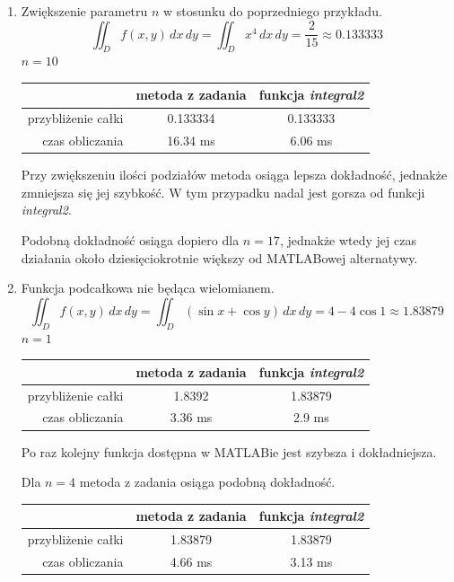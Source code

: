 \documentclass[12pt]{article}
\begin{document}
\begin{enumerate}[label=\textbf{Przykład \arabic*}]
		
		\item
		Zwiększenie parametru $n$ w stosunku do poprzedniego przykładu.
		$$\iint_D f(x, y) \,dx\,dy = \iint_D x^4 \,dx\,dy = \frac{2}{15} \approx 0.133333$$
		$n = 10$
		
		\begin{table}[H]
			\centering
			\begin{tabular}{|r|c|c|}
				\hline
				                   & metoda z zadania & funkcja \textit{integral2} \\ \hline
				przybliżenie całki &     0.133334     &          0.133333          \\ \hline
				   czas obliczania &     16.34 ms     &          6.06 ms           \\ \hline
			\end{tabular}
		\end{table}
	
		Przy zwiększeniu ilości podziałów metoda osiąga lepsza dokładność, jednakże zmniejsza się jej szybkość. W tym przypadku nadal jest gorsza od funkcji \textit{integral2}.
		
		Podobną dokładność osiąga dopiero dla $n = 17$, jednakże wtedy jej czas działania około dziesięciokrotnie większy od MATLABowej alternatywy.
		
		
		\item
		Funkcja podcałkowa nie będąca wielomianem.
		$$\iint_D f(x, y) \,dx\,dy = \iint_D (\sin x + \cos y) \,dx\,dy = 4 - 4\cos 1 \approx 1.83879$$
		$n = 1$
		
		\begin{table}[H]
			\centering
			\begin{tabular}{|r|c|c|}
				\hline
				                   & metoda z zadania & funkcja \textit{integral2} \\ \hline
				przybliżenie całki &      1.8392      &          1.83879           \\ \hline
				   czas obliczania &     3.36 ms      &           2.9 ms           \\ \hline
			\end{tabular}
		\end{table}
		
		Po raz kolejny funkcja dostępna w MATLABie jest szybsza i dokładniejsza.
		
		Dla $n = 4$ metoda z zadania osiąga podobną dokładność.
		\begin{table}[H]
			\centering
			\begin{tabular}{|r|c|c|}
				\hline
				                   & metoda z zadania & funkcja \textit{integral2} \\ \hline
				przybliżenie całki &     1.83879      &          1.83879           \\ \hline
				   czas obliczania &     4.66 ms      &          3.13 ms           \\ \hline
			\end{tabular}
		\end{table}
	

\end{enumerate}
\end{document}
